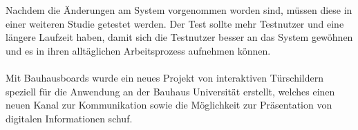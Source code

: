 \\
\\
Nachdem die Änderungen am System vorgenommen worden sind, müssen diese in einer weiteren Studie getestet werden.
Der Test sollte mehr Testnutzer und eine längere Laufzeit haben, damit sich die Testnutzer besser an das System gewöhnen und es in ihren alltäglichen Arbeitsprozess aufnehmen können.
\\
\\
Mit Bauhausboards wurde ein neues Projekt von interaktiven Türschildern speziell für die Anwendung an der Bauhaus Universität erstellt, welches einen neuen Kanal zur Kommunikation sowie die Möglichkeit zur Präsentation von digitalen Informationen schuf.